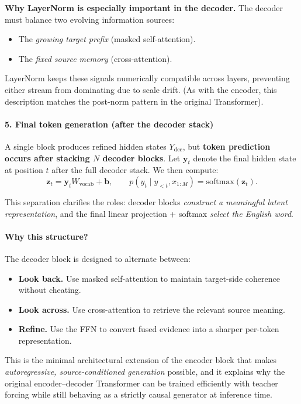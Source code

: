 \noindent
\textbf{Why LayerNorm is especially important in the decoder.}
The decoder must balance two evolving information sources:
\begin{itemize}
	\item The \emph{growing target prefix} (masked self-attention).
	\item The \emph{fixed source memory} (cross-attention).
\end{itemize}
LayerNorm keeps these signals numerically compatible across layers,
preventing either stream from dominating due to scale drift.
(As with the encoder, this description matches the post-norm pattern in the original Transformer).

\paragraph{5. Final token generation (after the decoder stack)}
\noindent
A single block produces refined hidden states \(Y_{\text{dec}}\),
but \textbf{token prediction occurs after stacking \(N\) decoder blocks}.
Let \(\mathbf{y}_t\) denote the final hidden state at position \(t\)
after the full decoder stack.
We then compute:
\[
\mathbf{z}_t = \mathbf{y}_t W_{\text{vocab}} + \mathbf{b},
\qquad
p(y_t \mid y_{<t}, x_{1:M}) = \text{softmax}(\mathbf{z}_t).
\]

\noindent
This separation clarifies the roles:
decoder blocks \emph{construct a meaningful latent representation},
and the final linear projection + softmax \emph{select the English word}.

\paragraph{Why this structure?}
\noindent
The decoder block is designed to alternate between:
\begin{itemize}
	\item \textbf{Look back.}
	Use masked self-attention to maintain target-side coherence without cheating.
	\item \textbf{Look across.}
	Use cross-attention to retrieve the relevant source meaning.
	\item \textbf{Refine.}
	Use the FFN to convert fused evidence into a sharper per-token representation.
\end{itemize}

\noindent
This is the minimal architectural extension of the encoder block
that makes \emph{autoregressive, source-conditioned generation} possible,
and it explains why the original encoder--decoder Transformer
can be trained efficiently with teacher forcing
while still behaving as a strictly causal generator at inference time.

